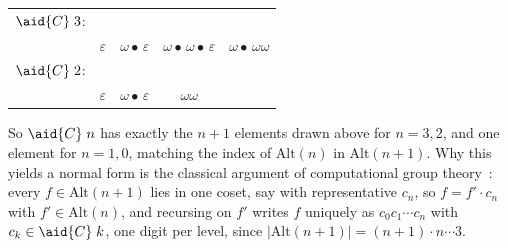 \begin{center}
\begin{minipage}[c]{0.37\linewidth}
\begin{code}
\<%
\end{code}
\endgroup
\end{minipage}\hfill%
\begin{minipage}[c]{0.58\linewidth}\centering\small
\begin{tabular}{@{}l@{\;\;}cccc@{}}
  $\aid{C}\;3$: &  &  &  & \\
  & $\varepsilon$ & $\omega{\bullet}\,\varepsilon$ & $\omega{\bullet}\,\omega{\bullet}\,\varepsilon$ & $\omega{\bullet}\,\omega\omega$\\[4pt]
  $\aid{C}\;2$: &  &  &  & \\
  & $\varepsilon$ & $\omega{\bullet}\,\varepsilon$ & $\omega\omega$ &
\end{tabular}
\end{minipage}
\end{center}

\noindent So $\aid{C}\;n$ has exactly the $n{+}1$ elements drawn above for $n = 3, 2$, and one element for $n = 1, 0$, matching the index of $\mathrm{Alt}(n)$ in $\mathrm{Alt}(n{+}1)$. Why this yields a normal form is the classical argument of computational group theory~\cite{sims1994computation,holt2005handbook}: every $f \in \mathrm{Alt}(n{+}1)$ lies in one coset, say with representative $c_n$, so $f = f' \cdot c_n$ with $f' \in \mathrm{Alt}(n)$, and recursing on $f'$ writes $f$ uniquely as $c_0 c_1 \cdots c_n$ with $c_k \in \aid{C}\;k$, one digit per level, since $|\mathrm{Alt}(n{+}1)| = (n{+}1) \cdot n \cdots 3$.

